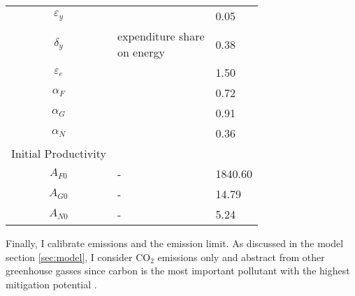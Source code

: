 \begin{table}[h!]
\begin{center}
\begin{tabular}{c|ll}
 			\hline
 			$\varepsilon_y$&\cite{Fried2018ClimateAnalysis}&0.05\\			
 			$\delta_y$&\makecell[l]{expenditure share \\ on energy \citep{EIAEnergy}}&0.38\\	
 			$\varepsilon_e$&&1.50\\	
 			$\alpha_F$&\cite{Fried2018ClimateAnalysis} &0.72\\
 			$\alpha_G$& &0.91\\
 			$\alpha_N$& &0.36 \\
 			\hline
 			\hline
 			Initial Productivity&\multicolumn{2}{c}{}\\
 			\hline
 			
 			\hline
 			$A_{F0}$&- &1840.60  \\
 			$A_{G0}$&- &14.79  \\
 			$A_{N0}$&- &5.24 \\
 			\hline \hline
 		\end{tabular}
 	\end{center}
 \end{table}
 \clearpage
 
 
 Finally, I calibrate emissions and the emission limit. As discussed in the model section \ref{sec:model},  I consider CO$_2$ emissions only and abstract from other greenhouse gasses since carbon is the most important pollutant with the highest mitigation potential \citep[p.29]{IPCC2022}.
 
